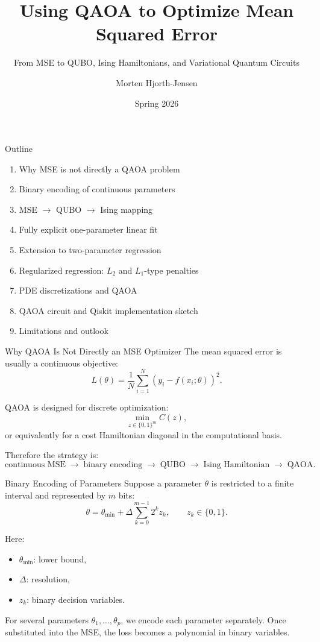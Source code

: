 \documentclass{beamer}
\title{Using QAOA to Optimize Mean Squared Error}
\subtitle{From MSE to QUBO, Ising Hamiltonians, and Variational Quantum Circuits}
\author{Morten Hjorth-Jensen}
\date{Spring 2026}
\begin{document}
\frame{\titlepage}

\begin{frame}{Outline}
\begin{enumerate}
\item Why MSE is not directly a QAOA problem
\item Binary encoding of continuous parameters
\item MSE \(\rightarrow\) QUBO \(\rightarrow\) Ising mapping
\item Fully explicit one-parameter linear fit
\item Extension to two-parameter regression
\item Regularized regression: \(L_2\) and \(L_1\)-type penalties
\item PDE discretizations and QAOA
\item QAOA circuit and Qiskit implementation sketch
\item Limitations and outlook
\end{enumerate}
\end{frame}

\begin{frame}{Why QAOA Is Not Directly an MSE Optimizer}
The mean squared error is usually a continuous objective:
\[
L(\theta)=\frac1N \sum_{i=1}^N \left(y_i-f(x_i;\theta)\right)^2.
\]

QAOA is designed for discrete optimization:
\[
\min_{z\in\{0,1\}^m} C(z),
\]
or equivalently for a cost Hamiltonian diagonal in the computational basis.

Therefore the strategy is:
\[
\text{continuous MSE}
\;\longrightarrow\;
\text{binary encoding}
\;\longrightarrow\;
\text{QUBO}
\;\longrightarrow\;
\text{Ising Hamiltonian}
\;\longrightarrow\;
\text{QAOA}.
\]
\end{frame}

\begin{frame}{Binary Encoding of Parameters}
Suppose a parameter \(\theta\) is restricted to a finite interval and represented by \(m\) bits:
\[
\theta = \theta_{\min} + \Delta \sum_{k=0}^{m-1} 2^k z_k,
\qquad z_k\in\{0,1\}.
\]

Here:
\begin{itemize}
\item \(\theta_{\min}\): lower bound,
\item \(\Delta\): resolution,
\item \(z_k\): binary decision variables.
\end{itemize}

For several parameters \(\theta_1,\dots,\theta_p\), we encode each parameter separately.
Once substituted into the MSE, the loss becomes a polynomial in binary variables.
\end{frame}
\end{document}
